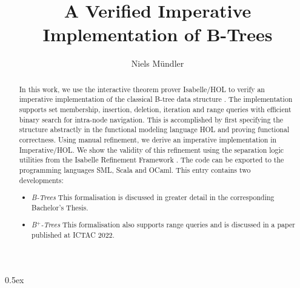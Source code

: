 \documentclass[11pt,a4paper]{article}
\begin{document}
\title{A Verified Imperative Implementation of B-Trees}
\author{Niels Mündler}
\date{}
\maketitle

\begin{abstract}
In this work, we use the interactive theorem prover Isabelle/HOL
to verify an imperative implementation of the classical B-tree data structure \cite{DBLP:journals/acta/BayerM72}.
The implementation supports set membership, insertion, deletion, iteration and range queries with efficient binary search for intra-node navigation.
This is accomplished by first specifying the structure abstractly 
in the functional modeling language HOL and proving functional correctness.
Using manual refinement, we derive an imperative implementation
in Imperative/HOL.
We show the validity of this refinement using
the separation logic utilities from the
Isabelle Refinement Framework \cite{Refine_Imperative_HOL-AFP}. 
The code can be exported to the programming languages SML, Scala and OCaml.
This entry contains two developments:
\begin{itemize}
    \item \emph{B-Trees} This formalisation is discussed in greater detail in the corresponding Bachelor's Thesis\cite{BTNielsMuendler}.
    \item \emph{B$^+$-Trees} This formalisation also supports range queries and is discussed in a paper published at ICTAC 2022.
\end{itemize}
\end{abstract}

\tableofcontents

\parindent 0pt\parskip 0.5ex



{\raggedright


}
\end{document}
